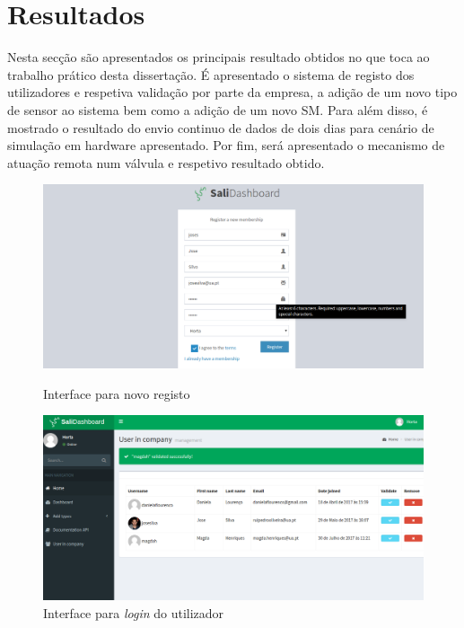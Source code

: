 \section{Resultados}


Nesta secção são apresentados os principais resultado obtidos no que toca ao trabalho prático desta dissertação. É apresentado o sistema de registo dos utilizadores e respetiva validação por parte da empresa, a adição de um novo tipo de sensor ao sistema bem como a adição de um novo \acl{SM}. Para além disso, é mostrado o resultado do envio continuo de dados de dois dias para cenário de simulação em hardware apresentado. Por fim, será apresentado o mecanismo de atuação remota num válvula e respetivo resultado obtido. 







\newpage


\begin{figure}[h]
	\centering
	\begin{minipage}[b]{0.495\textwidth}
		\centering
		\includegraphics[width=\textwidth]{prints-web/register.png}
		\caption{Interface para novo registo}
		\label{bluetth05-res}
	\end{minipage}
	\hfill
	\begin{minipage}[b]{0.495\textwidth}
		\centering
		\includegraphics[width=\textwidth]{prints-web/validate_company.png}
		\caption{Interface para \textit{login} do utilizador}
		\label{comimageesquema}
	\end{minipage}
\end{figure}


